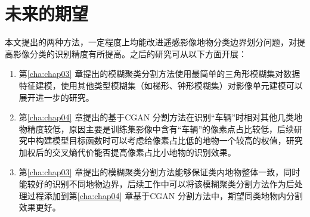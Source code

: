 \section{未来的期望}
\label{sec:5-2}
本文提出的两种方法，一定程度上均能改进遥感影像地物分类边界划分问题，对提高影像分类的识别精度有所提高。之后的研究可从以下方面开展：
\begin{enumerate}[(1)]
  \item  第\ref{cha:chap03} 章提出的模糊聚类分割方法使用最简单的三角形模糊集对数据特征建模，使用其他类型模糊集（如梯形、钟形模糊集）对影像单元建模可以展开进一步的研究。
  \item  第\ref{cha:chap04} 章提出的基于CGAN 分割方法在识别“车辆”时相对其他几类地物精度较低，原因主要是训练集影像中含有“车辆”的像素点占比较低，后续研究中构建模型目标函数时可以考虑给像素占比低的地物一个较高的权值，研究加权后的交叉熵代价能否提高像素占比小地物的识别效果。
  \item  第\ref{cha:chap03} 章提出的模糊聚类分割方法能够保证类内地物整体一致，同时能较好的识别不同地物边界，后续工作中可以将该模糊聚类分割方法作为后处理过程添加到第\ref{cha:chap04} 章基于CGAN 分割方法中，期望同类地物内分割效果更好。
  
\end{enumerate}